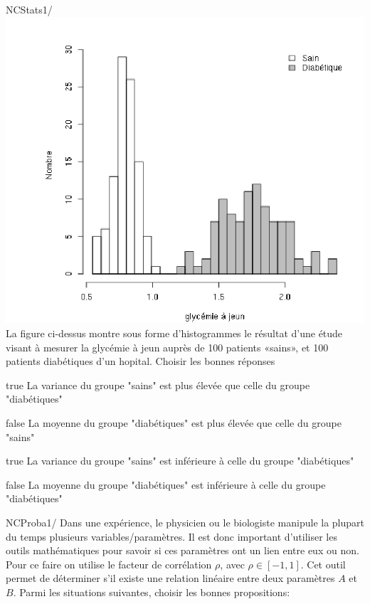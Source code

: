 \documentclass[11pt]{article}
\begin{document}
			
			
			\begin{question}{NC}{Stats}{1}{/} 
			\includegraphics[width=\textwidth]{Christopher/Figures_Christopher/glycemie_UE.png}
				La figure ci-dessus montre sous forme d’histogrammes le résultat d’une étude visant à mesurer la glycémie à jeun auprès de 100 patients «sains», et 100 patients diabétiques d’un hopital. Choisir les bonnes réponses

            \end{question}

            \begin{reponses}
            	\item[true]  La variance du groupe "sains" est plus élevée que celle du groupe "diabétiques"
            	\item[false] La moyenne du groupe "diabétiques" est plus élevée que celle du groupe "sains"
                \item[true]  La variance du groupe "sains" est inférieure à celle du groupe "diabétiques"
                \item[false] La moyenne du groupe "diabétiques"  est inférieure à celle du groupe "diabétiques"
            \end{reponses}
			
			
			
			 \begin{question}{NC}{Proba}{1}{/} 
 				Dans une expérience, le physicien ou le biologiste manipule la plupart du temps plusieurs variables/paramètres. Il est donc important d'utiliser les outils mathématiques pour savoir si ces paramètres ont un lien entre eux ou non. Pour ce faire on utilise le facteur de corrélation $\rho$, avec $\rho\in [-1,1]$. Cet outil permet de déterminer s'il existe une relation linéaire entre deux paramètres $A$ et $B$. Parmi les situations suivantes, choisir les bonnes propositions: 

            \end{question}
\end{document}
